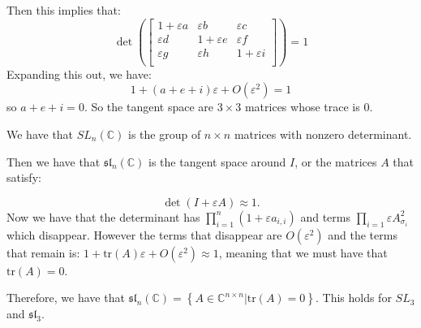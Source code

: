 \documentclass[]{article}
\newcommand{\tr}{\text{tr}}
\begin{document}
Then this implies that:
\begin{equation}
	\det
	\left(
	\begin{bmatrix}
		1 + \varepsilon a & \varepsilon b & \varepsilon c \\
		\varepsilon d & 1 + \varepsilon e & \varepsilon f \\
		\varepsilon g & \varepsilon h     & 1 + \varepsilon i\\
	\end{bmatrix}
	\right)
	= 1
\end{equation}
Expanding this out, we have:
\begin{equation}
	1 + (a + e + i)\varepsilon + O(\varepsilon^2) = 1
\end{equation}
so $a + e + i = 0$. So the tangent space are $3 \times 3$ matrices whose trace is 0.

We have that $SL_n(\mathbb{C})$ is the group of $n \times n$ matrices with nonzero determinant. 

Then we have that $\mathfrak{sl}_n(\mathbb{C})$ is the tangent space around $I$, or the matrices $A$ that satisfy:

\begin{equation}
	\det \left(I + \varepsilon A\right) \approx 1.
\end{equation}
Now we have that the determinant has $\prod_{i = 1}^n ( 1 + \varepsilon a_{i,i})$ and terms $\prod_{i = 1} \varepsilon A_{\sigma_i}^2$ which disappear. However the terms that disappear are $O(\varepsilon^2)$ and the terms that remain is: $1 + \tr(A) \varepsilon + O(\varepsilon^2) \approx 1$, meaning that we must have that $\tr(A) = 0$. 

Therefore, we have that $\mathfrak{sl}_n(\mathbb{C}) = \left\{A \in \mathbb{C}^{n \times n} | \tr(A) = 0\right\}$.
This holds for $SL_3$ and $\mathfrak{sl}_3$. 
\end{document}
